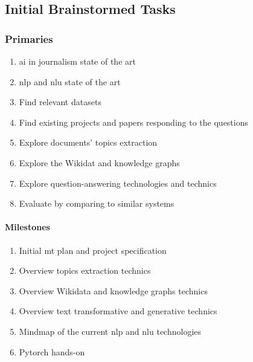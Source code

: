 \newpage
\subsection*{Initial Brainstormed Tasks}
\label*{annexes:initialtasks}

\subsubsection*{Primaries}
\begin{enumerate}
    \setlength\itemsep{0em}
    \item \gls{ai} in journalism state of the art
    \item \gls{nlp} and \gls{nlu} state of the art
    \item Find relevant datasets
    \item Find existing projects and papers responding to the questions
    \item Explore documents' topics extraction
    \item Explore the Wikidat and knowledge graphs
    \item Explore question-answering technologies and technics
    \item Evaluate by comparing to similar systems
\end{enumerate}
\paragraph{Milestones}
\begin{enumerate}
    \setlength\itemsep{0em}
    \item Initial \gls{mt} plan and project specification
    \item Overview topics extraction technics
    \item Overview Wikidata and knowledge graphs technics
    \item Overview text transformative and generative technics
    \item Mindmap of the current \gls{nlp} and \gls{nlu} technologies
    \item Pytorch hands-on
\end{enumerate}

